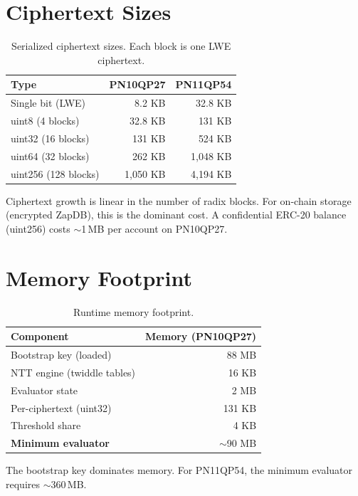\documentclass[11pt]{article}
\begin{document}
\section{Ciphertext Sizes}

\begin{table}[h]
\centering
\begin{tabular}{@{}lrr@{}}
\toprule
\textbf{Type} & \textbf{PN10QP27} & \textbf{PN11QP54} \\
\midrule
Single bit (LWE) & 8.2 KB & 32.8 KB \\
uint8 (4 blocks) & 32.8 KB & 131 KB \\
uint32 (16 blocks) & 131 KB & 524 KB \\
uint64 (32 blocks) & 262 KB & 1,048 KB \\
uint256 (128 blocks) & 1,050 KB & 4,194 KB \\
\bottomrule
\end{tabular}
\caption{Serialized ciphertext sizes. Each block is one LWE ciphertext.}
\label{tab:ct-sizes}
\end{table}

Ciphertext growth is linear in the number of radix blocks. For on-chain storage (encrypted ZapDB), this is the dominant cost. A confidential ERC-20 balance (uint256) costs $\sim$1\,MB per account on PN10QP27.

\section{Memory Footprint}

\begin{table}[h]
\centering
\begin{tabular}{@{}lr@{}}
\toprule
\textbf{Component} & \textbf{Memory (PN10QP27)} \\
\midrule
Bootstrap key (loaded) & 88 MB \\
NTT engine (twiddle tables) & 16 KB \\
Evaluator state & 2 MB \\
Per-ciphertext (uint32) & 131 KB \\
Threshold share & 4 KB \\
\midrule
\textbf{Minimum evaluator} & $\sim$90 MB \\
\bottomrule
\end{tabular}
\caption{Runtime memory footprint.}
\label{tab:memory}
\end{table}

The bootstrap key dominates memory. For PN11QP54, the minimum evaluator requires $\sim$360\,MB.
\end{document}
